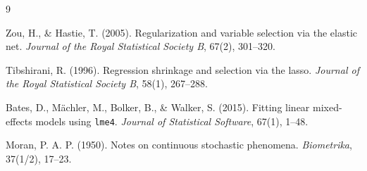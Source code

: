\documentclass[11pt,a4paper]{article}
\begin{document}
\begin{thebibliography}{9}

  Zou, H., \& Hastie, T. (2005).
  Regularization and variable selection via the elastic net.
  \textit{Journal of the Royal Statistical Society B}, 67(2),
  301--320.

  Tibshirani, R. (1996).
  Regression shrinkage and selection via the lasso. \textit{Journal
  of the Royal Statistical Society B}, 58(1), 267--288.

  Bates, D., Mächler, M., Bolker, B., \& Walker, S. (2015).
  Fitting linear mixed-effects models using \texttt{lme4}.
  \textit{Journal of Statistical Software}, 67(1), 1--48.

  Moran, P. A. P. (1950).
  Notes on continuous stochastic phenomena.
  \textit{Biometrika}, 37(1/2), 17--23.

\end{thebibliography}
\end{document}
